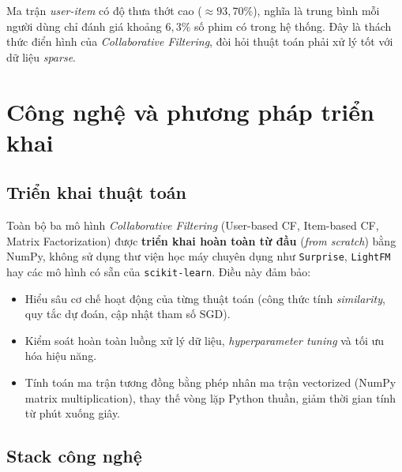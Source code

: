 \documentclass[../BTL.tex]{subfiles}
\begin{document}
Ma trận \textit{user-item} có độ thưa thớt cao ($\approx 93{,}70\%$), nghĩa là
trung bình mỗi người dùng chỉ đánh giá khoảng $6{,}3\%$ số phim có trong hệ thống.
Đây là thách thức điển hình của \textit{Collaborative Filtering}, đòi hỏi thuật
toán phải xử lý tốt với dữ liệu \textit{sparse}.

\section{Công nghệ và phương pháp triển khai}
\label{section:2.6}

\subsection{Triển khai thuật toán}
\label{section:2.6.1}

Toàn bộ ba mô hình \textit{Collaborative Filtering} (User-based CF, Item-based CF,
Matrix Factorization) được \textbf{triển khai hoàn toàn từ đầu} (\textit{from
scratch}) bằng NumPy, không sử dụng thư viện học máy chuyên dụng như
\texttt{Surprise}, \texttt{LightFM} hay các mô hình có sẵn của \texttt{scikit-learn}.
Điều này đảm bảo:

\begin{itemize}[itemsep=0.35em]
    \item Hiểu sâu cơ chế hoạt động của từng thuật toán (công thức tính
          \textit{similarity}, quy tắc dự đoán, cập nhật tham số SGD).
    \item Kiểm soát hoàn toàn luồng xử lý dữ liệu, \textit{hyperparameter tuning}
          và tối ưu hóa hiệu năng.
    \item Tính toán ma trận tương đồng bằng phép nhân ma trận vectorized
          (NumPy matrix multiplication), thay thế vòng lặp Python thuần, giảm thời
          gian tính từ phút xuống giây.
\end{itemize}

\subsection{Stack công nghệ}
\label{section:2.6.2}
\end{document}
